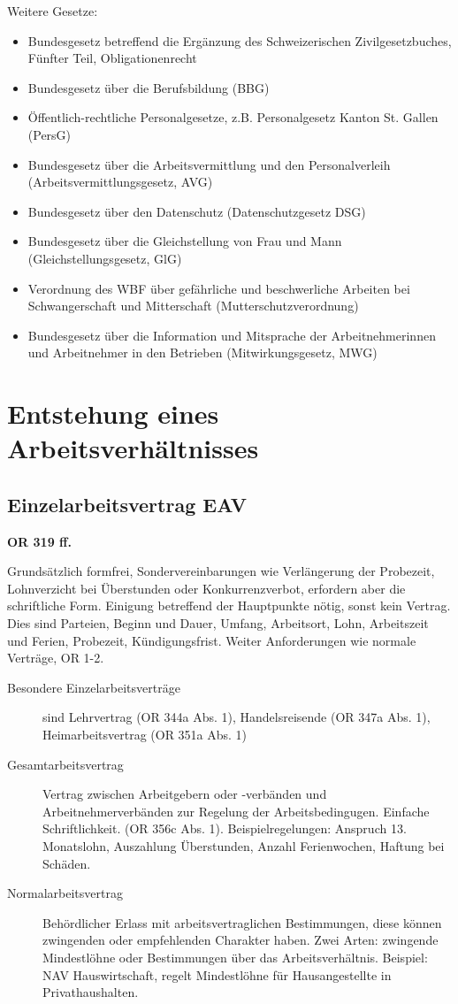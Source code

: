 \noindent
Weitere Gesetze:
\begin{itemize} 
  \item Bundesgesetz betreffend die Ergänzung des Schweizerischen Zivilgesetzbuches, Fünfter Teil, Obligationenrecht
  \item Bundesgesetz über die Berufsbildung (BBG)
  \item Öffentlich-rechtliche Personalgesetze, z.B. Personalgesetz Kanton St. Gallen (PersG)
  \item Bundesgesetz über die Arbeitsvermittlung und den Personalverleih (Arbeitsvermittlungsgesetz, AVG)
  \item Bundesgesetz über den Datenschutz (Datenschutzgesetz DSG)
  \item Bundesgesetz über die Gleichstellung von Frau und Mann (Gleichstellungsgesetz, GlG)
  \item Verordnung des WBF über gefährliche und beschwerliche Arbeiten bei Schwangerschaft und Mitterschaft (Mutterschutzverordnung)
  \item Bundesgesetz über die Information und Mitsprache der Arbeitnehmerinnen und Arbeitnehmer in den Betrieben (Mitwirkungsgesetz, MWG)
\end{itemize}

\section{Entstehung eines Arbeitsverhältnisses}

\subsection{Einzelarbeitsvertrag EAV}
\textbf{OR 319 ff.}

Grundsätzlich formfrei, Sondervereinbarungen wie Verlängerung der Probezeit, Lohnverzicht bei
Überstunden oder Konkurrenzverbot, erfordern aber die schriftliche Form. 
Einigung betreffend der Hauptpunkte nötig, sonst kein Vertrag. Dies sind Parteien, Beginn und Dauer, Umfang, Arbeitsort, Lohn, Arbeitszeit und Ferien, Probezeit, Kündigungsfrist.
Weiter Anforderungen wie normale Verträge, OR 1-2.

\begin{description}
  \item[Besondere Einzelarbeitsverträge] sind Lehrvertrag (OR 344a Abs. 1), Handelsreisende (OR 347a Abs. 1), Heimarbeitsvertrag (OR 351a Abs. 1)
  \item[Gesamtarbeitsvertrag] Vertrag zwischen Arbeitgebern oder -verbänden und Arbeitnehmerverbänden zur Regelung der Arbeitsbedingugen. Einfache Schriftlichkeit. (OR 356c Abs. 1). Beispielregelungen: Anspruch 13. Monatslohn, Auszahlung Überstunden, Anzahl Ferienwochen, Haftung bei Schäden. 
  \item[Normalarbeitsvertrag] Behördlicher Erlass mit arbeitsvertraglichen Bestimmungen, diese können zwingenden oder empfehlenden Charakter haben. Zwei Arten: zwingende Mindestlöhne oder Bestimmungen über das Arbeitsverhältnis. Beispiel: NAV Hauswirtschaft, regelt Mindestlöhne für Hausangestellte in Privathaushalten.
\end{description}


